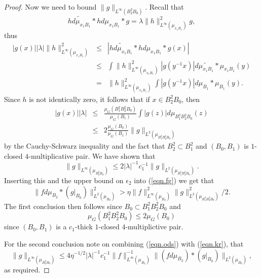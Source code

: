 \documentclass[12pt]{amsart}
\numberwithin{equation}{section}
\theoremstyle{plain}
\theoremstyle{definition}
\renewcommand{\leq}{\leqslant}
\begin{document}
\begin{proof}
Now we need to bound $\|g\|_{L^\infty(B_2^2B_0)}$.  Recall that
\begin{equation*}
\widetilde{hd\mu_{x_1B_1}}\ast hd\mu_{x_1B_1}  \ast g = \lambda \|h\|_{L^\infty(\mu_{x_1B_1})}^2g,
\end{equation*}
thus
\begin{eqnarray*}
|g(x)||\lambda| \|h\|_{L^\infty(\mu_{x_1B_1})}^2 & \leq & |\widetilde{hd\mu_{x_1B_1}}\ast hd\mu_{x_1B_1}  \ast g(x)|\\ & \leq & \int{\|h\|_{L^\infty(\mu_{x_1B_1})}^2|g(y^{-1}x)|d\widetilde{\mu_{x_1B_1}}\ast \mu_{x_1B_1}(y)}\\ & =& \|h\|_{L^\infty(\mu_{x_1B_1})}^2\int{|g(y^{-1}x)|d\mu_{B_1} \ast \mu_{B_1}(y)}.
\end{eqnarray*}
Since $h$ is not identically zero, it follows that if $x \in B_2^2B_0$, then
\begin{eqnarray*}
|g(x)||\lambda| & \leq &\frac{\mu_G(B_1^2B_2^2B_0)}{\mu_G(B_1)}\int{|g(z)|d\mu_{B_1^2B_2^2B_0}(z)}\\ & \leq &  2\frac{\mu_G(B_0)}{\mu_G(B_1)}\|g\|_{L^2(\mu_{B_1^2B_2^2B_0})}
\end{eqnarray*}
by the Cauchy-Schwarz inequality and the fact that $B_2^2 \subset B_1^2$ and $(B_0,B_1)$ is $1$-closed $4$-multiplicative pair.  We have shown that
\begin{equation}\label{eqn.ods}
\|g\|_{L^\infty(\mu_{B_2^2B_0})} \leq 2|\lambda|^{-1}c_1^{-1}\|g\|_{L^2(\mu_{B_1^2B_2^2B_0})}.
\end{equation}
Inserting this and the upper bound on $\epsilon_2$ into (\ref{eqn.fg}) we get that
\begin{equation}\label{eqn.kr}
 \|fd\mu_{B_2} \ast (g|_{B_0})\|_{L^2(\mu_{B_0})}^2 >\eta \|f\|_{L^\infty(\mu_{B_2})}^2\|g\|_{L^2(\mu_{B_1^2B_2^2B_0})}^2/2.
\end{equation}
The first conclusion then follows since $B_0 \subset B_1^2B_2^2B_0$ and
\begin{equation*}
\mu_G(B_1^2B_2^2B_0) \leq 2\mu_G(B_0)
\end{equation*}
since $(B_0,B_1)$ is a $c_1$-thick $1$-closed $4$-multiplictive pair.

For the second conclusion note on combining (\ref{eqn.ods}) with (\ref{eqn.kr}), that
\begin{equation*}
\|g\|_{L^\infty(\mu_{B_2^2B_0})} \leq 4\eta^{-1/2}|\lambda|^{-1}c_1^{-1} \|f\|_{L^\infty(\mu_{B_2})}^{-1}\|(fd\mu_{B_2}) \ast (g|_{B_0})\|_{L^2(\mu_{B_0})},
\end{equation*}
as required.
\end{proof}
 
\end{document}
